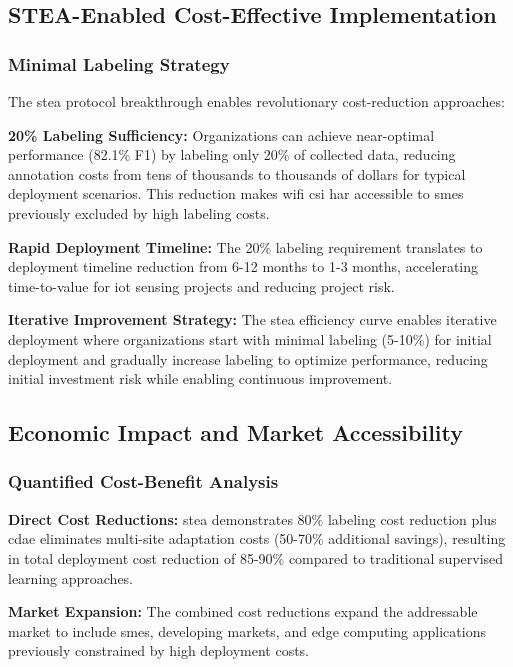 \documentclass[journal]{IEEEtran}
\begin{document}
\subsection{STEA-Enabled Cost-Effective Implementation}

\subsubsection{Minimal Labeling Strategy}

The \gls{stea} protocol breakthrough enables revolutionary cost-reduction approaches:

\textbf{20\% Labeling Sufficiency:} Organizations can achieve near-optimal performance (82.1\% F1) by labeling only 20\% of collected data, reducing annotation costs from tens of thousands to thousands of dollars for typical deployment scenarios. This reduction makes \gls{wifi} \gls{csi} \gls{har} accessible to \glspl{sme} previously excluded by high labeling costs.

\textbf{Rapid Deployment Timeline:} The 20\% labeling requirement translates to deployment timeline reduction from 6-12 months to 1-3 months, accelerating time-to-value for \gls{iot} sensing projects and reducing project risk.

\textbf{Iterative Improvement Strategy:} The \gls{stea} efficiency curve enables iterative deployment where organizations start with minimal labeling (5-10\%) for initial deployment and gradually increase labeling to optimize performance, reducing initial investment risk while enabling continuous improvement.

\subsection{Economic Impact and Market Accessibility}

\subsubsection{Quantified Cost-Benefit Analysis}

\textbf{Direct Cost Reductions:} \gls{stea} demonstrates 80\% labeling cost reduction plus \gls{cdae} eliminates multi-site adaptation costs (50-70\% additional savings), resulting in total deployment cost reduction of 85-90\% compared to traditional supervised learning approaches.

\textbf{Market Expansion:} The combined cost reductions expand the addressable market to include \glspl{sme}, developing markets, and edge computing applications previously constrained by high deployment costs.
\end{document}
